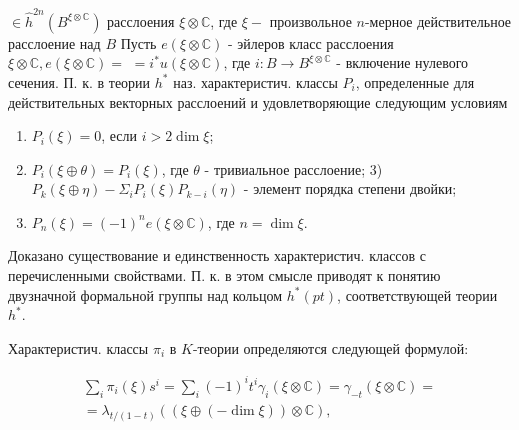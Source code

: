 \documentclass[10pt]{article}
\begin{document}
$\in \hat{h}^{2 n}\left(B^{\xi \otimes \mathbb{C}}\right)$ расслоения $\xi \otimes \mathbb{C}$, где $\xi-$ произвольное $n$-мерное действительное расслоение над $B$ Пусть $e(\xi \otimes \mathbb{C})$ - эйлеров класс расслоения $\xi \otimes \mathbb{C}, e(\xi \otimes \mathbb{C})=$ $=i^{*} u(\xi \otimes \mathbb{C})$, где $i: B \rightarrow B^{\xi \otimes \mathbb{C}}$ - включение нулевого сечения. П. к. в теории $h^{*}$ наз. характеристич. классы $P_{i}$, определенные для действительных векторных расслоений и удовлетворяющие следующим условиям



\begin{enumerate}

  \item $P_{i}(\xi)=0$, если $i>2 \operatorname{dim} \xi$;



  \item $P_{i}(\xi \oplus \theta)=P_{i}(\xi)$, где $\theta$ - тривиальное расслоение; 3) $P_{k}(\xi \oplus \eta)-\Sigma_{i} P_{i}(\xi) P_{k-i}(\eta)$ - элемент порядка степени двойки;



  \item $P_{n}(\xi)=(-1)^{n} e(\xi \otimes \mathbb{C})$, где $n=\operatorname{dim} \xi$.



\end{enumerate}



Доказано существование и единственность характеристич. классов с перечисленными свойствами. П. к. в этом смысле приводят к понятию двузначной формальной группы над кольцом $h^{*}(p t)$, соответствующей теории $h^{*}$.



Характеристич. классы $\pi_{i}$ в $K$-теории определяются следующей формулой:



\[

\begin{gathered}

\sum_{i} \pi_{i}(\xi) s^{i}=\sum_{i}(-1)^{i} t^{i} \gamma_{i}(\xi \otimes \mathbb{C})=\gamma_{-t}(\xi \otimes \mathbb{C})= \\

=\lambda_{t /(1-t)}((\xi \oplus(-\operatorname{dim} \xi)) \otimes \mathbb{C}),

\end{gathered}

\]
\end{document}
